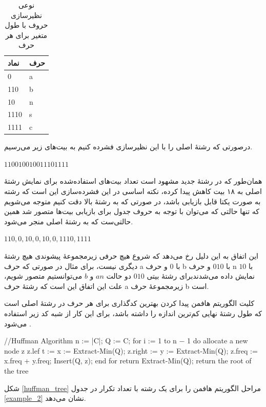\begin{table}[H]
        \centering
        \caption{نوعی نظیرسازی حروف با طول متغیر برای هر حرف}
        \label{huffman}
        \begin{tabular}{ll}
        \hline
        نماد & حرف \\ \hline
        0 & a \\
        110 & b \\
        10 & n \\
        1110 & s \\
        1111 & c \\ \hline
        \end{tabular}
\end{table}

درصورتی که رشتهٔ اصلی را با این نظیرسازی فشرده کنیم به بیت‌های زیر می‌رسیم.

\begin{center}
        $110010010011101111$
\end{center}

همان‌طور که در رشتهٔ جدید مشهود است تعداد بیت‌های استفاده‌شده برای نمایش
رشتهٔ اصلی به ۱۸ بیت کاهش پیدا کرده، نکته اساسی در این فشرده‌سازی 
این است که رشته به صورت یکتا قابل بازیابی باشد، در صورتی که به رشتهٔ بالا
دقت کنیم متوجه می‌شویم که تنها حالتی که می‌توان با توجه به حروف جدول برای
بازیابی بیت‌ها متصور شد همین حالتی‌ست که به رشتهٔ اصلی منجر می‌شود.
\begin{center}
        $110,0,10,0,10,0,1110,1111$ 
\end{center}

این اتفاق به این دلیل
رخ می‌دهد که شروع هیچ حرفی زیرمجموعهٔ پیشوندی هیچ رشتهٔ دیگری نیست، 
برای مثال در صورتی که حرف a با 
$0$ 
و حرف b
با 
$010$ 
و حرف 
n 
با 
$10$ 
نمایش داده می‌شدندبرای رشتهٔ بیتی 
$010$
دو حالت
$an$
و 
$b$
می‌توانستیم متصور شویم، علت این اتفاق این است که رشتهٔ حرف 
a 
زیرمجموعهٔ حرف 
b
است. 

کلیت الگوریتم هافمن پیدا کردن بهترین کدگذاری برای هر حرف در رشتهٔ اصلی 
است که طول رشتهٔ نهایی کم‌ترین اندازه را داشته باشد، برای این کار از شبه کد زیر استفاده می‌شود \cite{huffman}.
\vspace{5mm}

\begin{code}
//Huffman Algorithm
n := |C|;
Q := C;
for i := 1 to n − 1 do
        allocate a new node z
        z.lef t := x := Extract-Min(Q);
        z.right := y := Extract-Min(Q);
        z.freq := x.freq + y.freq;
        Insert(Q, z);
end for
return Extract-Min(Q); {return the root of the tree}
\end{code}
\vspace{5mm}
شکل 
\ref{huffman_tree}
مراحل الگوریتم هافمن را برای یک رشته با تعداد تکرار در جدول
\ref{example_2}
نشان می‌دهد.


